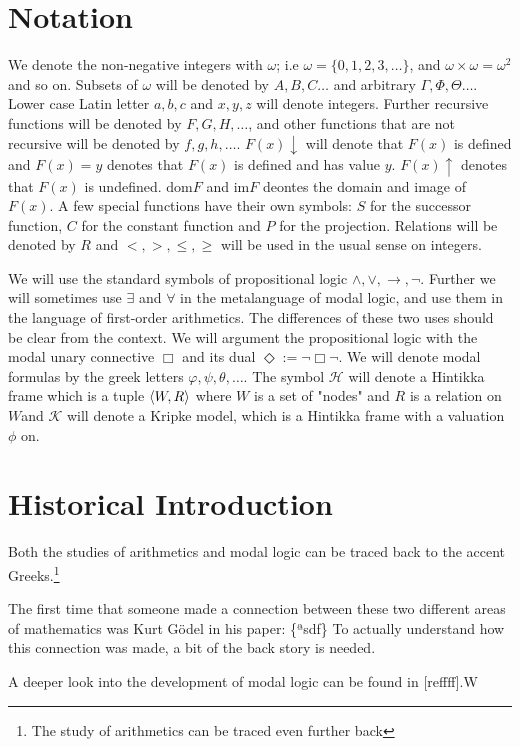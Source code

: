 \documentclass[../main.tex]{subfiles}
\begin{document}
\section{Notation}

We denote the non-negative integers with $\omega$; i.e
$\omega=\{0,1,2,3,\ldots\}$, and $\omega\times\omega=\omega^2$ and so on.
Subsets of $\omega$ will be denoted by $A,B,C\ldots$ and arbitrary 
$\Gamma,\Phi,\Theta\ldots$. Lower case Latin letter $a,b,c$ and $x,y,z$ will
denote integers. Further recursive functions will be denoted by
$F,G,H,\ldots$, and other functions that are not recursive will be denoted by
$f,g,h,\ldots$. $F(x)\downarrow$ will denote that $F(x)$ is defined and
$F(x)=y$ denotes that $F(x)$ is defined and has value $y$. $F(x)\uparrow$
denotes that $F(x)$ is undefined. $\text{dom}F$ and $\text{im} F$ deontes the
domain and image of $F(x)$.
A few special functions have their own symbols: $S$ for the
successor function, $C$ for the constant function and $P$ for the projection.
Relations will be denoted by $R$ and $<,>,\leq,\geq$ will be used in the usual
sense on integers.

We will use the standard symbols of propositional  logic
$\wedge,\vee,\rightarrow,\neg$. Further we will sometimes use $\exists$ and
$\forall$ in the metalanguage of modal logic, and use them in the language of
first-order arithmetics. The differences of these two uses should be clear
from the context. We will argument the propositional logic with the modal unary
connective $\Box$ and its dual $\Diamond:=\neg\Box\neg$. We will denote modal
formulas by the greek letters $\varphi,\psi,\theta,\ldots$. The symbol
$\mathcal{H}$ will denote a
Hintikka frame  which is a tuple $\langle W,R\rangle$ where $W$ is a set of "nodes" and
$R$ is a relation on $W$and
$\mathcal{K}$ will denote a Kripke model, which is a Hintikka frame with a
valuation $\phi$ on.

\section{Historical Introduction}
Both the studies of arithmetics and modal logic can be traced back to the
accent Greeks.\footnote{The study of arithmetics can be traced even further
back}

The first time that someone made a connection between these two different areas
of mathematics was Kurt Gödel in his paper: \{ªsdf\} To actually understand how
this connection was made, a bit of the back story is needed. 


A deeper look into the development of modal logic can be found in [reffff].W
\end{document}
